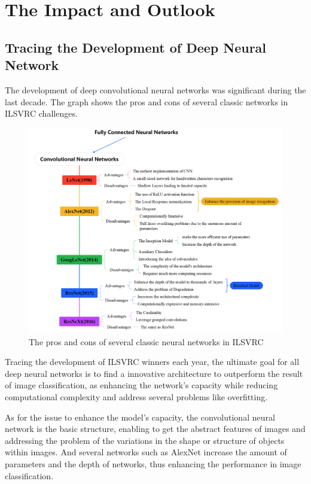 \documentclass[a4paper]{article}
\begin{document}
\section{The Impact and Outlook}

\subsection{Tracing the Development of Deep Neural Network}

The development of deep convolutional neural networks was significant during the last decade. The graph shows the pros and cons of several classic networks in ILSVRC challenges.

\begin{figure}[ht]
    \centering
    \includegraphics[width=\textwidth]{images/siwei.png}
    \caption{The pros and cons of several classic neural networks in ILSVRC}
\end{figure}

Tracing the development of ILSVRC winners each year, the ultimate goal for all deep neural networks is to find a innovative architecture to outperform the result of image classification, as enhancing the network's capacity while reducing computational complexity and address several problems like overfitting.

As for the issue to enhance the model's capacity, the convolutional neural network is the basic structure, enabling to get the abstract features of images and addressing the problem of the variations in the shape or structure of objects within images. And several networks such as AlexNet increase the amount of parameters and the depth of networks, thus enhancing the performance in image classification.
\end{document}
